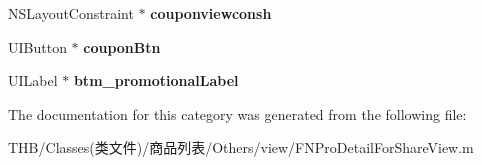 \begin{DoxyCompactItemize}
\mbox{\label{category_f_n_pro_detail_for_share_view_07_08_a13f39a366ffc11337dee74dfc4f70f98}} 
N\+S\+Layout\+Constraint $\ast$ {\bfseries couponviewconsh}
\item 
\mbox{\label{category_f_n_pro_detail_for_share_view_07_08_a4b29be546df237eae2425af240a93ebb}} 
U\+I\+Button $\ast$ {\bfseries coupon\+Btn}
\item 
\mbox{\label{category_f_n_pro_detail_for_share_view_07_08_aa7d73d4b35272aa98af57d780d6d819a}} 
U\+I\+Label $\ast$ {\bfseries btm\+\_\+promotional\+Label}
\end{DoxyCompactItemize}


The documentation for this category was generated from the following file\+:\begin{DoxyCompactItemize}
\item 
T\+H\+B/\+Classes(类文件)/商品列表/\+Others/view/F\+N\+Pro\+Detail\+For\+Share\+View.\+m\end{DoxyCompactItemize}
